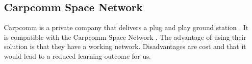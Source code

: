 \subsection{Carpcomm Space Network}
Carpcomm is a private company that delivers a plug and play ground station \cite{carpcomm-gs1}. 
It is compatible with the Carpcomm Space Network \cite{carpcomm-sn}. 
The advantage of using their solution is that they have a working network. Disadvantages are cost and that it would lead to a reduced learning outcome for us.